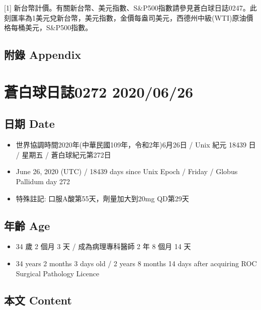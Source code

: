 \documentclass[a5paper, 11pt
]{book}
\providecommand{\tightlist}{%
  \setlength{\itemsep}{0pt}\setlength{\parskip}{0pt}}
\begin{document}
{[}1{]}
新台幣計價。有關新台幣、美元指數、S\&P500指數請參見蒼白球日誌0247。此刻匯率為1美元兌新台幣，美元指數，金價每盎司美元，西德州中級(WTI)原油價格每桶美元，S\&P500指數。

\hypertarget{ux9644ux9304-appendix-24}{%
\subsection{附錄 Appendix}\label{ux9644ux9304-appendix-24}}

\hypertarget{ux84bcux767dux7403ux65e5ux8a8c0272-20200626}{%
\section{蒼白球日誌0272
2020/06/26}\label{ux84bcux767dux7403ux65e5ux8a8c0272-20200626}}

\hypertarget{ux65e5ux671f-date-25}{%
\subsection{日期 Date}\label{ux65e5ux671f-date-25}}

\begin{itemize}
\tightlist
\item
  世界協調時間2020年(中華民國109年，令和2年)6月26日 / Unix 紀元 18439 日
  / 星期五 / 蒼白球紀元第272日
\item
  June 26, 2020 (UTC) / 18439 days since Unix Epoch / Friday / Globus
  Pallidum day 272
\item
  特殊註記: 口服A酸第55天，劑量加大到20mg QD第29天
\end{itemize}

\hypertarget{ux5e74ux9f61-age-25}{%
\subsection{年齡 Age}\label{ux5e74ux9f61-age-25}}

\begin{itemize}
\tightlist
\item
  34 歲 2 個月 3 天 / 成為病理專科醫師 2 年 8 個月 14 天
\item
  34 years 2 months 3 days old / 2 years 8 months 14 days after
  acquiring ROC Surgical Pathology Licence
\end{itemize}

\hypertarget{ux672cux6587-content-25}{%
\subsection{本文 Content}\label{ux672cux6587-content-25}}
\end{document}
